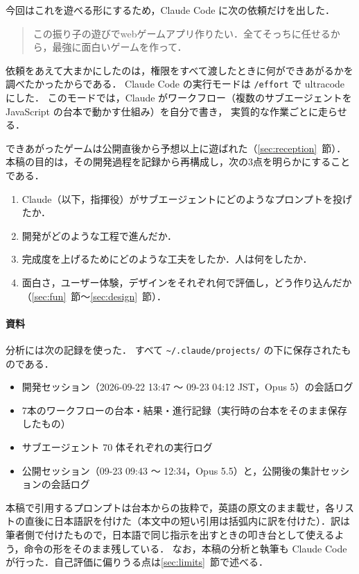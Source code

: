 \documentclass[a4paper,10pt]{ltjsarticle}
\newcommand{\secref}[1]{\ref{#1}~節}
\newcommand{\code}[1]{\texttt{#1}}
\begin{document}
今回はこれを遊べる形にするため，Claude Code に次の依頼だけを出した．

\begin{quote}
この振り子の遊びでwebゲームアプリ作りたい．全てそっちに任せるから，最強に面白いゲームを作って．
\end{quote}

依頼をあえて大まかにしたのは，権限をすべて渡したときに何ができあがるかを調べたかったからである．
Claude Code の実行モードは \code{/effort} で ultracode にした．
このモードでは，Claude がワークフロー（複数のサブエージェントを JavaScript の台本で動かす仕組み）を自分で書き，
実質的な作業ごとに走らせる．

できあがったゲームは公開直後から予想以上に遊ばれた（\secref{sec:reception}）．
本稿の目的は，その開発過程を記録から再構成し，次の3点を明らかにすることである．
\begin{enumerate}
  \item Claude（以下，指揮役）がサブエージェントにどのようなプロンプトを投げたか．
  \item 開発がどのような工程で進んだか．
  \item 完成度を上げるためにどのような工夫をしたか．人は何をしたか．
  \item 面白さ，ユーザー体験，デザインをそれぞれ何で評価し，どう作り込んだか（\secref{sec:fun}〜\secref{sec:design}）．
\end{enumerate}

\paragraph{資料} 分析には次の記録を使った．
すべて \code{\textasciitilde/.claude/projects/} の下に保存されたものである．
\begin{itemize}
  \item 開発セッション（2026-09-22 13:47 〜 09-23 04:12 JST，Opus 5）の会話ログ
  \item 7本のワークフローの台本・結果・進行記録（実行時の台本をそのまま保存したもの）
  \item サブエージェント 70 体それぞれの実行ログ
  \item 公開セッション（09-23 09:43 〜 12:34，Opus 5.5）と，公開後の集計セッションの会話ログ
\end{itemize}
本稿で引用するプロンプトは台本からの抜粋で，英語の原文のまま載せ，各リストの直後に日本語訳を付けた（本文中の短い引用は括弧内に訳を付けた）．訳は筆者側で付けたもので，日本語で同じ指示を出すときの叩き台として使えるよう，命令の形をそのまま残している．
なお，本稿の分析と執筆も Claude Code が行った．自己評価に偏りうる点は\secref{sec:limits}で述べる．
\end{document}
